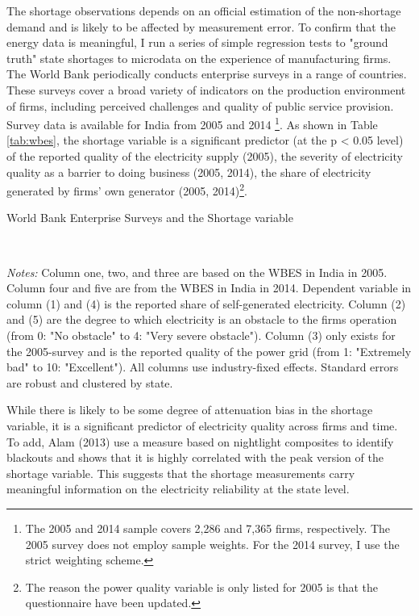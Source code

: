 \documentclass[11pt]{article}
\begin{document}
The shortage observations depends on an official estimation of the non-shortage demand and is likely to be affected by measurement error. To confirm that the energy data is meaningful, I run a series of simple regression tests to "ground truth" state shortages to microdata on the experience of manufacturing firms. 
The World Bank periodically conducts enterprise surveys in a range of countries. These surveys cover a broad variety of indicators on the production environment of firms, including perceived challenges and quality of public service provision. Survey data is available for India from 2005 and 2014 \citep{world_bank_enterprise_2020-1,world_bank_enterprise_2020-2}\footnote{The 2005 and 2014 sample covers 2,286 and 7,365 firms, respectively. The 2005 survey does not employ sample weights. For the 2014 survey, I use the strict weighting scheme.}. As shown in Table \ref{tab:wbes}, the shortage variable is a significant predictor (at the p < 0.05 level) of the reported quality of the electricity supply (2005), the severity of electricity quality as a barrier to doing business (2005, 2014), the share of electricity generated by firms' own generator (2005, 2014)\footnote{The reason the power quality variable is only listed for 2005 is that the questionnaire have been updated.}.

\begin{table}
    \caption{World Bank Enterprise Surveys and the Shortage variable}
    \label{tab:wbes}
    \begin{minipage}{0.95\textwidth} 

    \\
    { \footnotesize \textit{Notes:} Column one, two, and three are based on the WBES in India in 2005. Column four and five are from the WBES in India in 2014. Dependent variable in column (1) and (4) is the reported share of self-generated electricity. Column (2) and (5) are the degree to which electricity is an obstacle to the firms operation (from 0: "No obstacle" to 4: "Very severe obstacle"). Column (3) only exists for the 2005-survey and is the reported quality of the power grid (from 1: "Extremely bad" to 10: "Excellent"). All columns use industry-fixed effects. Standard errors are robust and clustered by state. \\
\par}
    \end{minipage}
\end{table}   

While there is likely to be some degree of attenuation bias in the shortage variable, it is a significant predictor of electricity quality across firms and time. To add, Alam (2013) use a measure based on nightlight composites to identify blackouts and shows that it is highly correlated with the peak version of the shortage variable. This suggests that the shortage measurements carry meaningful information on the electricity reliability at the state level.
\end{document}
